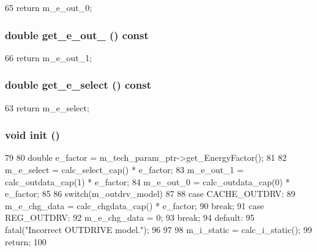\begin{DoxyCode}
65 { return m_e_out_0; }
\end{DoxyCode}
\hypertarget{classOutdrvUnit_a93a70c4c184a65ff5fc02745ba07a13f}{
\subsubsection[{get\_\-e\_\-out\_\-1}]{\setlength{\rightskip}{0pt plus 5cm}double get\_\-e\_\-out\_ () const}}
\label{classOutdrvUnit_a93a70c4c184a65ff5fc02745ba07a13f}



\begin{DoxyCode}
66 { return m_e_out_1; }
\end{DoxyCode}
\hypertarget{classOutdrvUnit_afa46136b7f2a247b6a04e1c5662f1857}{
\subsubsection[{get\_\-e\_\-select}]{\setlength{\rightskip}{0pt plus 5cm}double get\_\-e\_\-select () const}}
\label{classOutdrvUnit_afa46136b7f2a247b6a04e1c5662f1857}



\begin{DoxyCode}
63 { return m_e_select; }
\end{DoxyCode}
\hypertarget{classOutdrvUnit_a02fd73d861ef2e4aabb38c0c9ff82947}{
\subsubsection[{init}]{\setlength{\rightskip}{0pt plus 5cm}void init ()}}
\label{classOutdrvUnit_a02fd73d861ef2e4aabb38c0c9ff82947}



\begin{DoxyCode}
79 {
80     double e_factor = m_tech_param_ptr->get_EnergyFactor();
81 
82     m_e_select = calc_select_cap() * e_factor;
83     m_e_out_1 = calc_outdata_cap(1) * e_factor;
84     m_e_out_0 = calc_outdata_cap(0) * e_factor;
85 
86     switch(m_outdrv_model)
87     {
88         case CACHE_OUTDRV:
89             m_e_chg_data = calc_chgdata_cap() * e_factor;
90             break;
91         case REG_OUTDRV:
92             m_e_chg_data = 0;
93             break;
94         default:
95             fatal("Incorrect OUTDRIVE model.\n");
96     }
97 
98     m_i_static = calc_i_static();
99     return;
100 }
\end{DoxyCode}


